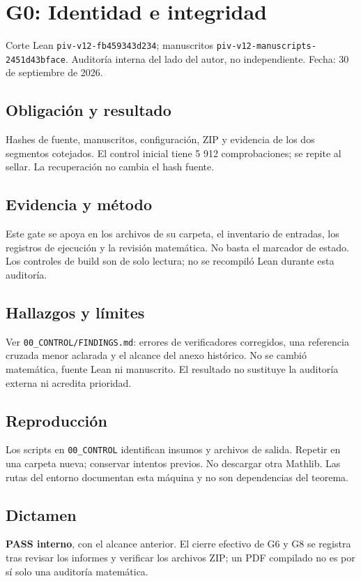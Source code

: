 \section{G0: Identidad e integridad}\label{g0-identidad-e-integridad}

Corte Lean \texttt{piv-v12-fb459343d234}; manuscritos
\texttt{piv-v12-manuscripts-2451d43bface}. Auditoría interna del lado
del autor, no independiente. Fecha: 30 de septiembre de 2026.

\subsection{Obligación y resultado}\label{obligaciuxf3n-y-resultado}

Hashes de fuente, manuscritos, configuración, ZIP y evidencia de los dos
segmentos cotejados. El control inicial tiene 5 912 comprobaciones; se
repite al sellar. La recuperación no cambia el hash fuente.

\subsection{Evidencia y método}\label{evidencia-y-muxe9todo}

Este gate se apoya en los archivos de su carpeta, el inventario de
entradas, los registros de ejecución y la revisión matemática. No basta
el marcador de estado. Los controles de build son de solo lectura; no se
recompiló Lean durante esta auditoría.

\subsection{Hallazgos y límites}\label{hallazgos-y-luxedmites}

Ver \texttt{00\_CONTROL/FINDINGS.md}: errores de verificadores
corregidos, una referencia cruzada menor aclarada y el alcance del anexo
histórico. No se cambió matemática, fuente Lean ni manuscrito. El
resultado no sustituye la auditoría externa ni acredita prioridad.

\subsection{Reproducción}\label{reproducciuxf3n}

Los scripts en \texttt{00\_CONTROL} identifican insumos y archivos de
salida. Repetir en una carpeta nueva; conservar intentos previos. No
descargar otra Mathlib. Las rutas del entorno documentan esta máquina y
no son dependencias del teorema.

\subsection{Dictamen}\label{dictamen}

\textbf{PASS interno}, con el alcance anterior. El cierre efectivo de G6
y G8 se registra tras revisar los informes y verificar los archivos ZIP;
un PDF compilado no es por sí solo una auditoría matemática.
